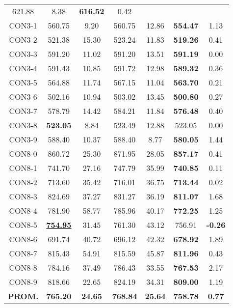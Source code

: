 \begin{table}[ht]
\begin{tabular}{c c c c c c c}
621.88 & 8.38 & \bf{616.52} & 
0.42\\CON3-1 & 560.75 & 9.20 & 
560.75 & 12.86 & \bf{554.47} & 
1.13\\CON3-2 & 521.38 & 15.30 & 
523.24 & 11.83 & \bf{519.26} & 
0.41\\CON3-3 & 591.20 & 11.02 & 
591.20 & 13.51 & \bf{591.19} & 
0.00\\CON3-4 & 591.43 & 10.85 & 
591.72 & 12.98 & \bf{589.32} & 
0.36\\CON3-5 & 564.88 & 11.74 & 
567.15 & 11.04 & \bf{563.70} & 
0.21\\CON3-6 & 502.16 & 10.94 & 
503.02 & 13.45 & \bf{500.80} & 
0.27\\CON3-7 & 578.79 & 14.42 & 
584.21 & 11.84 & \bf{576.48} & 
0.40\\CON3-8 & \bf{523.05} & 8.84 & 
523.49 & 12.88 & 523.05 & 0.00\\
CON3-9 & 588.40 & 10.37 & 
588.40 & 8.77 & \bf{580.05} & 
1.44\\CON8-0 & 860.72 & 25.30 & 
871.95 & 28.05 & \bf{857.17} & 
0.41\\CON8-1 & 741.70 & 27.16 & 
747.79 & 35.99 & \bf{740.85} & 
0.11\\CON8-2 & 713.60 & 35.42 & 
716.01 & 36.75 & \bf{713.44} & 
0.02\\CON8-3 & 824.69 & 37.27 & 
831.27 & 36.19 & \bf{811.07} & 
1.68\\CON8-4 & 781.90 & 58.77 & 
785.96 & 40.17 & \bf{772.25} & 
1.25\\CON8-5 & \bf{\underline{754.95}} & 31.45 & 
761.30 & 43.12 & 756.91 & 
\bf{-0.26}\\CON8-6 & 691.74 & 40.72 & 
696.12 & 42.32 & \bf{678.92} & 
1.89\\CON8-7 & 815.43 & 54.91 & 
815.59 & 45.87 & \bf{811.96} & 
0.43\\CON8-8 & 784.16 & 37.49 & 
786.43 & 33.55 & \bf{767.53} & 
2.17\\CON8-9 & 818.66 & 22.65 & 
824.19 & 34.31 & \bf{809.00} & 
1.19\\\bf{PROM.} & 
\bf{765.20} & \bf{24.65} & \bf{768.84} & \bf{25.64} & \bf{758.78} & \bf{0.77}\\[1ex]\hline
\end{tabular}
\label{table:nonlin}
\end{table} \clearpage
